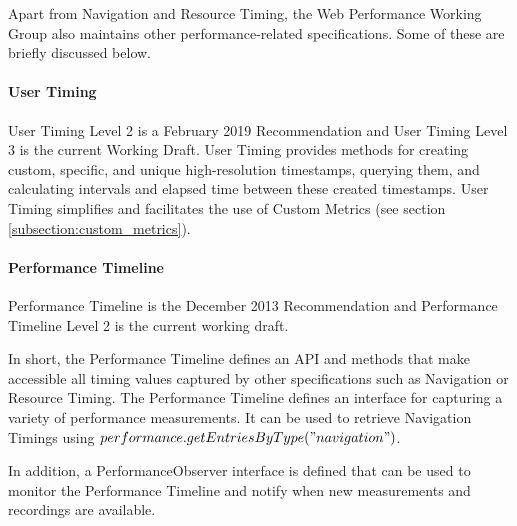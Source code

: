 Apart from Navigation and Resource Timing, the Web Performance Working Group also maintains other performance-related specifications.
Some of these are briefly discussed below.


\paragraph{User Timing} %

User Timing Level 2 is a February 2019 Recommendation and User Timing Level 3 is the current Working Draft.
User Timing provides methods for creating custom, specific, and unique high-resolution timestamps, querying them, and calculating intervals and elapsed time between these created timestamps. %
User Timing simplifies and facilitates the use of Custom Metrics (see section \ref{subsection:custom_metrics}).




\paragraph{Performance Timeline} %

Performance Timeline is the December 2013 Recommendation %
and Performance Timeline Level 2 is the current working draft. %

In short, the Performance Timeline defines an API and methods that make accessible all timing values captured by other specifications such as Navigation or Resource Timing.
The Performance Timeline defines an interface for capturing a variety of performance measurements. 
It can be used to retrieve Navigation Timings using $performance.getEntriesByType("navigation")$.

In addition, a PerformanceObserver interface is defined that can be used to monitor the Performance Timeline and notify when new measurements and recordings are available.



